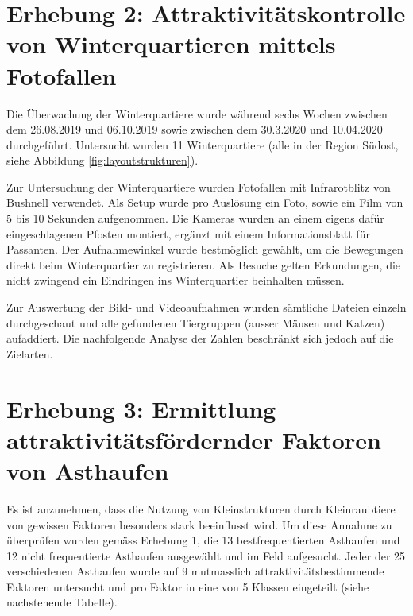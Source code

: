 \documentclass[
  oneside]{scrbook}
\begin{document}
\hypertarget{erhebung-2-attraktivituxe4tskontrolle-von-winterquartieren-mittels-fotofallen}{%
\section{Erhebung 2: Attraktivitätskontrolle von Winterquartieren mittels Fotofallen}\label{erhebung-2-attraktivituxe4tskontrolle-von-winterquartieren-mittels-fotofallen}}

Die Überwachung der Winterquartiere wurde während sechs Wochen zwischen dem 26.08.2019 und 06.10.2019 sowie zwischen dem 30.3.2020 und 10.04.2020 durchgeführt. Untersucht wurden 11 Winterquartiere (alle in der Region Südost, siehe Abbildung \ref{fig:layoutstrukturen}).

Zur Untersuchung der Winterquartiere wurden Fotofallen mit Infrarotblitz von Bushnell verwendet. Als Setup wurde pro Auslösung ein Foto, sowie ein Film von 5 bis 10 Sekunden aufgenommen. Die Kameras wurden an einem eigens dafür eingeschlagenen Pfosten montiert, ergänzt mit einem Informationsblatt für Passanten. Der Aufnahmewinkel wurde bestmöglich gewählt, um die Bewegungen direkt beim Winterquartier zu registrieren. Als Besuche gelten Erkundungen, die nicht zwingend ein Eindringen ins Winterquartier beinhalten müssen.

Zur Auswertung der Bild- und Videoaufnahmen wurden sämtliche Dateien einzeln durchgeschaut und alle gefundenen Tiergruppen (ausser Mäusen und Katzen) aufaddiert. Die nachfolgende Analyse der Zahlen beschränkt sich jedoch auf die Zielarten.

\hypertarget{erhebung-3-ermittlung-attraktivituxe4tsfuxf6rdernder-faktoren-von-asthaufen}{%
\section{Erhebung 3: Ermittlung attraktivitätsfördernder Faktoren von Asthaufen}\label{erhebung-3-ermittlung-attraktivituxe4tsfuxf6rdernder-faktoren-von-asthaufen}}

Es ist anzunehmen, dass die Nutzung von Kleinstrukturen durch Kleinraubtiere von gewissen Faktoren besonders stark beeinflusst wird.
Um diese Annahme zu überprüfen wurden gemäss Erhebung 1, die 13 bestfrequentierten Asthaufen und 12 nicht frequentierte Asthaufen ausgewählt und im Feld aufgesucht. Jeder der 25 verschiedenen Asthaufen wurde auf 9 mutmasslich attraktivitätsbestimmende Faktoren untersucht und pro Faktor in eine von 5 Klassen eingeteilt (siehe nachstehende Tabelle).
\end{document}
